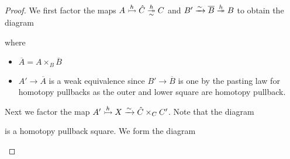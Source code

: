 \begin{prop}
\begin{proof}
        We first factor the maps $A\xtailrightarrow{h}\hat{C}\xtwoheadrightarrow[\sim]{h} C$ and $B'\xrightarrow{\sim}\overline{B}\xtwoheadrightarrow{h} B$ to obtain the diagram
        \begin{center}
        \end{center}
        where 
        \begin{itemize}
            \item $\overline{A}=A\times_{B}\overline{B}$
            \item $A'\to \overline{A}$ is a weak equivalence since $B'\to\overline{B}$ is one by the pasting law for homotopy pullbacks as the outer and lower square are homotopy pullback.
        \end{itemize}
        Next we factor the map $A'\xtailrightarrow{h}X\xrightarrow{\sim}\hat{C}\times_CC'$. 
        Note that the diagram 
        \begin{center}
        \end{center}
        is a homotopy pullback square.
        We form the diagram
        \begin{center}
\end{center}
\end{proof}
\end{prop}

